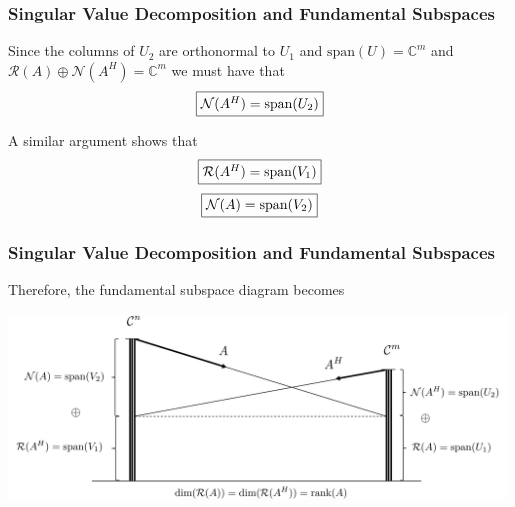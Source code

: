 \documentclass{beamer}
\begin{document}
\begin{frame}\frametitle{Singular Value Decomposition and Fundamental Subspaces}
	Since the columns of 
	$U_2$ 
	are orthonormal to 
	$U_1$ and 
	$\text{span}(U) = \mathbb{C}^m$ 
	and 
	$\mathcal{R}(A) \oplus \mathcal{N}(A^H) = \mathbb{C}^m$ 
	we must have that
	\[
		\fbox{$\mathcal{N}(A^H) = \text{span}(U_2)$}
	\]
	
	A similar argument shows that
	\[
		\fbox{$\mathcal{R}(A^H) = \text{span}(V_1)$}
	\]
	\[
		\fbox{$\mathcal{N}(A) = \text{span}(V_2)$}
	\]	
\end{frame}

\begin{frame}\frametitle{Singular Value Decomposition and Fundamental Subspaces}

	Therefore, the fundamental subspace diagram becomes
	\begin{center}
		\includegraphics[width=0.99\textwidth]
			{figures/chap7_fundamental_subspace_3}	
	\end{center}
\end{frame}
\end{document}
